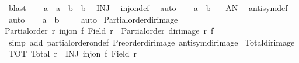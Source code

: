 \begin{isabellebody}
\ blast\isanewline
\ \ \isamarkupfalse%
\ {\isachardoublequoteopen}a{}\ {\isacharequal}{\kern0pt}\ a{}\ {\isasymand}\ b{}\ {\isacharequal}{\kern0pt}\ b{}{\isachardoublequoteclose}\ \isamarkupfalse%
\ INJ\ \isamarkupfalse%
\ inj{\isacharunderscore}{\kern0pt}on{\isacharunderscore}{\kern0pt}def\ \isamarkupfalse%
\ auto\isanewline
\ \ \isamarkupfalse%
\ {\isachardoublequoteopen}a{}\ {\isacharequal}{\kern0pt}\ b{}{\isachardoublequoteclose}\ \isamarkupfalse%
\ {}\ AN\ \isamarkupfalse%
\ antisym{\isacharunderscore}{\kern0pt}def\ \isamarkupfalse%
\ auto\isanewline
\ \ \isamarkupfalse%
\ {\isachardoublequoteopen}a{\isacharprime}{\kern0pt}\ {\isacharequal}{\kern0pt}\ b{\isacharprime}{\kern0pt}{\isachardoublequoteclose}\ \isamarkupfalse%
\ {}\ \isamarkupfalse%
\ auto\isanewline
{}\isamarkupfalse%
%
\endisatagproof
{\isafoldproof}%
%
\isadelimproof
\isanewline
%
\endisadelimproof
\isanewline
{}\isamarkupfalse%
\ Partial{\isacharunderscore}{\kern0pt}order{\isacharunderscore}{\kern0pt}dir{\isacharunderscore}{\kern0pt}image{\isacharcolon}{\kern0pt}\isanewline
{\isachardoublequoteopen}{\isasymlbrakk}Partial{\isacharunderscore}{\kern0pt}order\ r{\isacharsemicolon}{\kern0pt}\ inj{\isacharunderscore}{\kern0pt}on\ f\ {\isacharparenleft}{\kern0pt}Field\ r{\isacharparenright}{\kern0pt}{\isasymrbrakk}\ {\isasymLongrightarrow}\ Partial{\isacharunderscore}{\kern0pt}order\ {\isacharparenleft}{\kern0pt}dir{\isacharunderscore}{\kern0pt}image\ r\ f{\isacharparenright}{\kern0pt}{\isachardoublequoteclose}\isanewline
%
\isadelimproof
%
\endisadelimproof
%
\isatagproof
{}\isamarkupfalse%
\ {\isacharparenleft}{\kern0pt}simp\ add{\isacharcolon}{\kern0pt}\ partial{\isacharunderscore}{\kern0pt}order{\isacharunderscore}{\kern0pt}on{\isacharunderscore}{\kern0pt}def\ Preorder{\isacharunderscore}{\kern0pt}dir{\isacharunderscore}{\kern0pt}image\ antisym{\isacharunderscore}{\kern0pt}dir{\isacharunderscore}{\kern0pt}image{\isacharparenright}{\kern0pt}%
\endisatagproof
{\isafoldproof}%
%
\isadelimproof
\isanewline
%
\endisadelimproof
\isanewline
{}\isamarkupfalse%
\ Total{\isacharunderscore}{\kern0pt}dir{\isacharunderscore}{\kern0pt}image{\isacharcolon}{\kern0pt}\isanewline
{}\ TOT{\isacharcolon}{\kern0pt}\ {\isachardoublequoteopen}Total\ r{\isachardoublequoteclose}\ \ INJ{\isacharcolon}{\kern0pt}\ {\isachardoublequoteopen}inj{\isacharunderscore}{\kern0pt}on\ f\ {\isacharparenleft}{\kern0pt}Field\ r{\isacharparenright}{\kern0pt}{\isachardoublequoteclose}\isanewline

\end{isabellebody}
